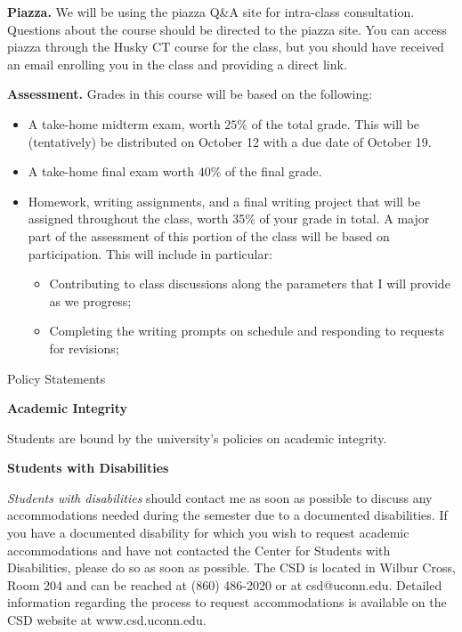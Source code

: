 \documentclass[12pt]{article}
\begin{document}
{\bf Piazza.}  We will be using the piazza Q\&A site for intra-class consultation.  Questions about the course should be directed to the piazza site.  You can access piazza through the Husky CT course for the class, but you should have received an email enrolling you in the class and providing a direct link.

{\bf Assessment.}  Grades in this course will be based on the
following:
\begin{itemize}
\item A take-home midterm exam,  worth $25\%$ of the total grade.  This will be (tentatively)
  be distributed on October 12 with a due date of October 19.
\item A take-home final exam worth $40\%$ of the final grade.
\item Homework, writing assignments, and a final writing project that will be assigned throughout
  the class, worth 35\% of your grade in total.  A major part of the assessment of this portion of the class will be based on participation.
  This will include in particular:
  \begin{itemize}
  \item Contributing to class discussions along the parameters that I will provide as we progress;
  \item Completing the writing prompts on schedule and responding to requests for revisions;
\end{itemize}

\end{itemize}

\begin{center}

{\Large Policy Statements}

\end{center}


{\bf Academic Integrity} 

Students are bound by the university's policies on academic integrity.

{\bf Students with Disabilities}

{\it Students with disabilities} should contact me as soon as
possible to discuss any accommodations needed during the semester due
to a documented disabilities.  If you have a documented disability for
which you wish to request academic accommodations and have not
contacted the Center for Students with Disabilities, please do so as
soon as possible.  The CSD is located in Wilbur Cross, Room 204 and
can be reached at (860) 486-2020 or at csd@uconn.edu.  Detailed
information regarding the process to request accommodations is
available on the CSD website at www.csd.uconn.edu.  
\end{document}

